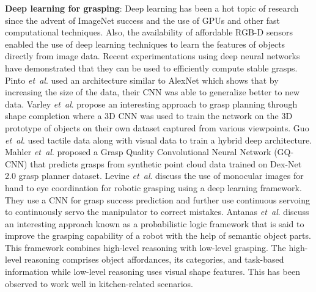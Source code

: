 \documentclass[letterpaper, 10pt, conference]{IEEEtran}
\newcommand{\etal}{\textit{et~al}. }
\begin{document}
\textbf{Deep learning for grasping}: Deep learning has been a hot topic of research since the advent of ImageNet success and the use of GPU\textquotesingle s and other fast computational techniques. Also, the availability of affordable RGB-D sensors enabled the use of deep learning techniques to learn the features of objects directly from image data. Recent experimentations using deep neural networks \cite{redmon2015real,schmidt2018grasping,zeng2018robotic} have demonstrated that they can be used to efficiently compute stable grasps. Pinto \etal \cite{pinto2016supersizing} used an architecture similar to AlexNet which shows that by increasing the size of the data, their CNN was able to generalize better to new data.  Varley \etal \cite{varley2017shape} propose an interesting approach to grasp planning through shape completion where a 3D CNN was used to train the network on the 3D prototype of objects on their own dataset captured from various viewpoints. Guo \etal \cite{guo2017hybrid} used tactile data along with visual data to train a hybrid deep architecture. Mahler \etal \cite{mahler2017dex} proposed a Grasp Quality Convolutional Neural Network (GQ-CNN) that predicts grasps from synthetic point cloud data trained on Dex-Net 2.0 grasp planner dataset. Levine \etal \cite{levine2018learning} discuss the use of monocular images for hand to eye coordination for robotic grasping using a deep learning framework. They use a CNN for grasp success prediction and further use continuous servoing to continuously servo the manipulator to correct mistakes. Antanas \etal \cite{antanas2019semantic} discuss an interesting approach known as a probabilistic logic framework that is said to improve the grasping capability of a robot with the help of semantic object parts. This framework combines high-level reasoning with low-level grasping. The high-level reasoning comprises object affordances, its categories, and task-based information while low-level reasoning uses visual shape features. This has been observed to work well in kitchen-related scenarios.
\end{document}
